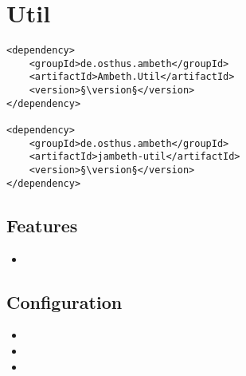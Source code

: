 \section{Util}
\label{module:Util}
\ClearAPI
\TODO
\begin{lstlisting}[style=POM,caption={Maven modules to use \emph{Ambeth Util}}]
<dependency>
	<groupId>de.osthus.ambeth</groupId>
	<artifactId>Ambeth.Util</artifactId>
	<version>§\version§</version>
</dependency>

<dependency>
	<groupId>de.osthus.ambeth</groupId>
	<artifactId>jambeth-util</artifactId>
	<version>§\version§</version>
</dependency>
\end{lstlisting}
\subsection{Features}
\begin{itemize}
	\item \TODO
\end{itemize}

\subsection{Configuration}
\begin{itemize}
	\item {}
	\item {}
	\item {}
\end{itemize}
